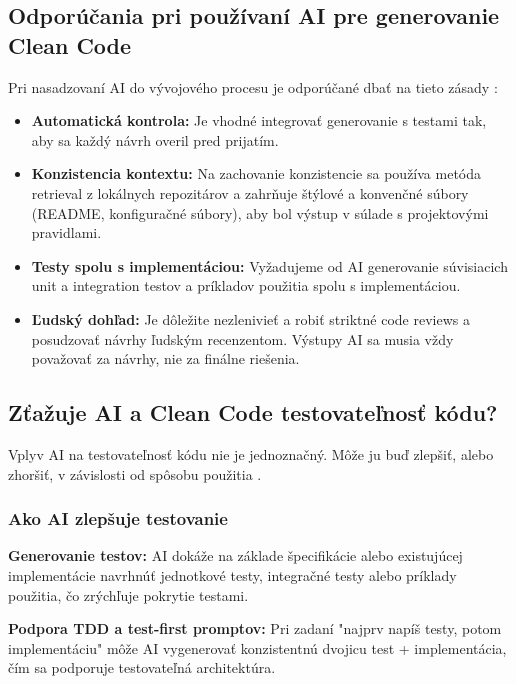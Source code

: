 \subsection{Odporúčania pri používaní AI pre generovanie Clean Code}

Pri nasadzovaní AI do vývojového procesu je odporúčané dbať na tieto zásady \cite{CODECAMP_AICC2026}:

\begin{itemize}
    \item \textbf{Automatická kontrola:} Je vhodné integrovať generovanie s testami tak, aby sa každý návrh overil pred prijatím.
    
    \item \textbf{Konzistencia kontextu:} Na zachovanie konzistencie sa používa metóda retrieval z lokálnych repozitárov a zahrňuje štýlové a konvenčné súbory (README, konfiguračné súbory), aby bol výstup v súlade s projektovými pravidlami.
    
    \item \textbf{Testy spolu s implementáciou:} Vyžadujeme od AI generovanie súvisiacich unit a integration testov a príkladov použitia spolu s implementáciou.
    
    \item \textbf{Ľudský dohľad:} Je dôležite nezlenivieť a robiť striktné code reviews a posudzovať návrhy ľudským recenzentom. Výstupy AI sa musia vždy považovať za návrhy, nie za finálne riešenia.
\end{itemize}

\subsection{Zťažuje AI a Clean Code testovateľnosť kódu?}

Vplyv AI na testovateľnosť kódu nie je jednoznačný. Môže ju buď zlepšiť, alebo zhoršiť, v závislosti od spôsobu použitia \cite{CODECAMP_AICC2026}.

\subsubsection{Ako AI zlepšuje testovanie}

\textbf{Generovanie testov:} AI dokáže na základe špecifikácie alebo existujúcej implementácie navrhnúť jednotkové testy, integračné testy alebo príklady použitia, čo zrýchľuje pokrytie testami.
    
\textbf{Podpora TDD a test-first promptov:} Pri zadaní "najprv napíš testy, potom implementáciu" môže AI vygenerovať konzistentnú dvojicu test + implementácia, čím sa podporuje testovateľná architektúra.
    
